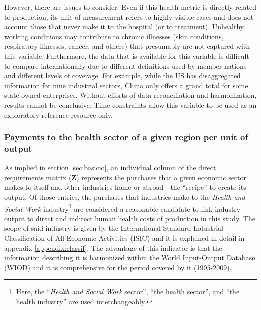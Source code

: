 \documentclass[a4paper,12pt, ]{article}
\begin{document}
However, there are issues to consider. Even if this health metric is directly related to production, its unit of measurement refers to highly visible cases and does not account those that never make it to the hospital (or to treatment). Unhealthy working conditions may contribute to chronic illnesses (skin conditions, respiratory illnesses, cancer, and others) that presumably are not captured with this variable. Furthermore, the data that is available for this variable is difficult to compare internationally due to different definitions used by member nations and different levels of coverage. For example, while the US has disaggregated information for nine industrial sectors, China only offers a grand total for some state-owned enterprises. Without efforts of data reconciliation and harmonization, results cannot be conclusive. Time constraints allow this variable to be used as an exploratory reference resource only.


\subsubsection{Payments to the health sector of a given region per unit of output}
\label{subsec:payhealth}

As implied in section \ref{sec:basicio}, an individual column of the direct requirements matrix ($\textbf{Z}$) represents the purchases that a given economic sector makes to itself and other industries home or abroad---the ``recipe'' to create its output. Of those entries, the purchases that industries make to the \textit{Health and Social Work} industry\footnote{Here, the ``\textit{Health and Social Work} sector'', ``the health sector'', and ``the health industry'' are used interchangeably.} are considered a reasonable candidate to link industry output to direct and indirect human health costs of production in this study. The scope of said industry is given by
the International Standard Industrial Classification of All Economic Activities (ISIC) and it is explained in detail in appendix \ref{appendix:classif}. The advantage of this indicator is that the information describing it is harmonized within the World Input-Output Database (WIOD) and it is comprehensive for the period covered by it (1995-2009).
\end{document}
